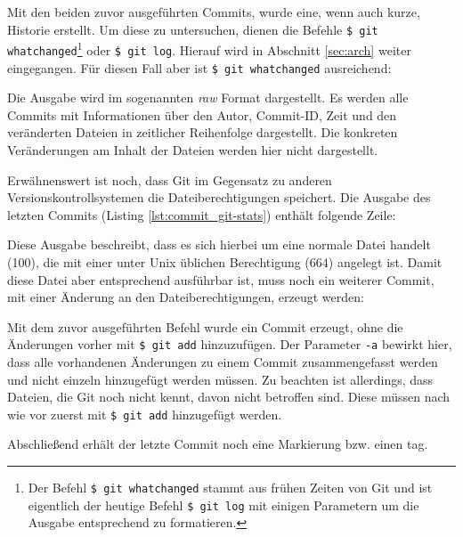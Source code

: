 
Mit den beiden zuvor ausgeführten Commits, wurde eine, wenn auch
kurze, Historie erstellt. Um diese zu untersuchen, dienen die Befehle
\texttt{\$ git whatchanged}\footnote{Der Befehl \texttt{\$ git whatchanged}
stammt aus frühen Zeiten von Git und ist eigentlich der heutige Befehl
\texttt{\$ git log} mit einigen Parametern um die Ausgabe entsprechend zu
formatieren.} oder \texttt{\$ git log}. Hierauf wird in Abschnitt \ref{sec:arch}
weiter eingegangen. Für diesen Fall aber ist \texttt{\$ git whatchanged}
ausreichend:


Die Ausgabe wird im sogenannten \textit{raw} Format dargestellt. Es werden alle
Commits mit Informationen über den Autor, Commit-ID, Zeit und den veränderten
Dateien in zeitlicher Reihenfolge dargestellt. Die konkreten Veränderungen am
Inhalt der Dateien werden hier nicht dargestellt.

Erwähnenswert ist noch, dass Git im Gegensatz zu anderen
Versionskontrollsystemen die Dateiberechtigungen speichert. Die Ausgabe des
letzten Commits (Listing \ref{lst:commit_git-stats}) enthält folgende Zeile:


Diese Ausgabe beschreibt, dass es sich hierbei um eine normale Datei handelt (100),
die mit einer unter Unix üblichen Berechtigung (664) angelegt ist. Damit
diese Datei aber entsprechend ausführbar ist, muss noch ein weiterer
Commit, mit einer Änderung an den Dateiberechtigungen, erzeugt werden:


Mit dem zuvor ausgeführten Befehl wurde ein Commit erzeugt, ohne die
Änderungen vorher mit \texttt{\$ git add} hinzuzufügen. Der Parameter
\texttt{-a} bewirkt hier, dass alle vorhandenen Änderungen zu einem Commit
zusammengefasst werden und nicht einzeln hinzugefügt werden müssen. Zu beachten
ist allerdings, dass Dateien, die Git noch nicht kennt, davon nicht betroffen
sind. Diese müssen nach wie vor zuerst mit \texttt{\$ git add} hinzugefügt
werden.

Abschließend erhält der letzte Commit noch eine Markierung bzw. einen \gls{tag}.

